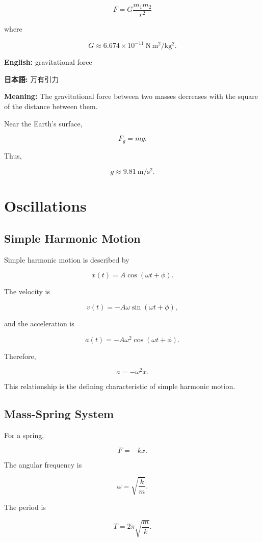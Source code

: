 \documentclass[11pt,a4paper]{article}
\begin{document}
\[
F=G\frac{m_1m_2}{r^2}
\]

where

\[
G\approx6.674\times10^{-11}
\ \mathrm{N\,m^2/kg^2}.
\]

\textbf{English:} gravitational force

\textbf{日本語:} 万有引力

\textbf{Meaning:} The gravitational force between two masses decreases with the square of the distance between them.

Near the Earth's surface,

\[
F_g=mg.
\]

Thus,

\[
g\approx9.81\ \mathrm{m/s^2}.
\]

\section{Oscillations}

\subsection{Simple Harmonic Motion}

Simple harmonic motion is described by

\[
x(t)=A\cos(\omega t+\phi).
\]

The velocity is

\[
v(t)=-A\omega\sin(\omega t+\phi),
\]

and the acceleration is

\[
a(t)=-A\omega^2\cos(\omega t+\phi).
\]

Therefore,

\[
a=-\omega^2x.
\]

This relationship is the defining characteristic of simple harmonic motion.

\subsection{Mass-Spring System}

For a spring,

\[
F=-kx.
\]

The angular frequency is

\[
\omega=\sqrt{\frac{k}{m}}.
\]

The period is

\[
T=2\pi\sqrt{\frac{m}{k}}.
\]
\end{document}
